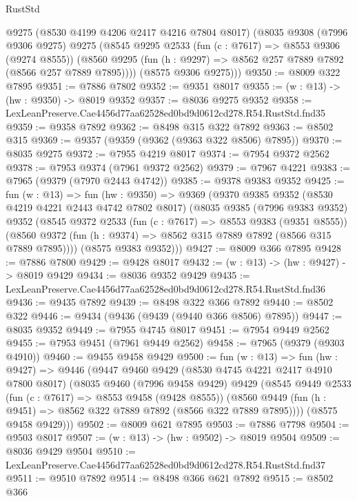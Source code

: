 \begin{lexlean}{RustStd}
\begin{coremodule}
      @9275
      (@8530 @4199 @4206 @2417 @4216 @7804 @8017)
      (@8035
        @9308
        (@7996 @9306 @9275)
        @9275
        (@8545
          @9295
          @2533
          (fun (c : @7617) => @8553 @9306 (@9274 @8555))
          (@8560 @9295 (fun (h : @9297) => @8562 @257 @7889 @7892 (@8566 @257 @7889 @7895))))
        (@8575 @9306 @9275)))
@9350 := @8009 @322 @7895
@9351 := @7886 @7802
@9352 := @9351 @8017
@9355 := (w : @13) -> (hw : @9350) -> @8019 @9352
@9357 := @8036 @9275 @9352
@9358 := LexLeanPreserve.Cae4456d77aa62528ed0bd9d0612cd278.R54.RustStd.fnd35
@9359 := @9358 @7892
@9362 := @8498 @315 @322 @7892
@9363 := @8502 @315
@9369 := @9357 (@9359 (@9362 (@9363 @322 @8506) @7895))
@9370 := @8035 @9275
@9372 := @7955 @4219 @8017
@9374 := @7954 @9372 @2562
@9378 := @7953 @9374 (@7961 @9372 @2562)
@9379 := @7967 @4221
@9383 := @7965 (@9379 (@7970 @2443 @4742))
@9385 := @9378 @9383 @9352
@9425 := fun (w : @13) =>
  fun (hw : @9350) =>
  @9369
    (@9370
      @9385
      @9352
      (@8530 @4219 @4221 @2443 @4742 @7802 @8017)
      (@8035
        @9385
        (@7996 @9383 @9352)
        @9352
        (@8545
          @9372
          @2533
          (fun (c : @7617) => @8553 @9383 (@9351 @8555))
          (@8560 @9372 (fun (h : @9374) => @8562 @315 @7889 @7892 (@8566 @315 @7889 @7895))))
        (@8575 @9383 @9352)))
@9427 := @8009 @366 @7895
@9428 := @7886 @7800
@9429 := @9428 @8017
@9432 := (w : @13) -> (hw : @9427) -> @8019 @9429
@9434 := @8036 @9352 @9429
@9435 := LexLeanPreserve.Cae4456d77aa62528ed0bd9d0612cd278.R54.RustStd.fnd36
@9436 := @9435 @7892
@9439 := @8498 @322 @366 @7892
@9440 := @8502 @322
@9446 := @9434 (@9436 (@9439 (@9440 @366 @8506) @7895))
@9447 := @8035 @9352
@9449 := @7955 @4745 @8017
@9451 := @7954 @9449 @2562
@9455 := @7953 @9451 (@7961 @9449 @2562)
@9458 := @7965 (@9379 (@9303 @4910))
@9460 := @9455 @9458 @9429
@9500 := fun (w : @13) =>
  fun (hw : @9427) =>
  @9446
    (@9447
      @9460
      @9429
      (@8530 @4745 @4221 @2417 @4910 @7800 @8017)
      (@8035
        @9460
        (@7996 @9458 @9429)
        @9429
        (@8545
          @9449
          @2533
          (fun (c : @7617) => @8553 @9458 (@9428 @8555))
          (@8560 @9449 (fun (h : @9451) => @8562 @322 @7889 @7892 (@8566 @322 @7889 @7895))))
        (@8575 @9458 @9429)))
@9502 := @8009 @621 @7895
@9503 := @7886 @7798
@9504 := @9503 @8017
@9507 := (w : @13) -> (hw : @9502) -> @8019 @9504
@9509 := @8036 @9429 @9504
@9510 := LexLeanPreserve.Cae4456d77aa62528ed0bd9d0612cd278.R54.RustStd.fnd37
@9511 := @9510 @7892
@9514 := @8498 @366 @621 @7892
@9515 := @8502 @366

\end{coremodule}
\end{lexlean}
